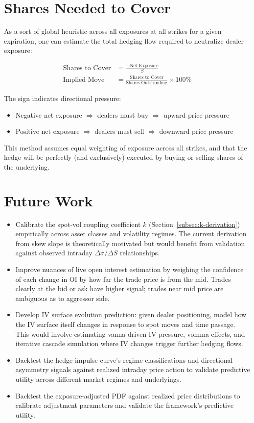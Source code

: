 \documentclass[11pt, a4paper]{article}
\begin{document}
\section{Shares Needed to Cover}

As a sort of global heuristic across all exposures at all strikes for a given expiration, one can estimate the total hedging flow required to neutralize dealer exposure:

\begin{align}
\text{Shares to Cover} &= \frac{-\text{Net Exposure}}{S} \\
\text{Implied Move} &= \frac{\text{Shares to Cover}}{\text{Shares Outstanding}} \times 100\%
\end{align}

The sign indicates directional pressure:
\begin{itemize}
    \item Negative net exposure $\Rightarrow$ dealers must buy $\Rightarrow$ upward price pressure
    \item Positive net exposure $\Rightarrow$ dealers must sell $\Rightarrow$ downward price pressure
\end{itemize}

This method assumes equal weighting of exposure across all strikes, and that the hedge will be perfectly (and exclusively) executed by buying or selling shares of the underlying.

\section{Future Work}

\begin{itemize}
    \item Calibrate the spot-vol coupling coefficient $k$ (Section~\ref{subsec:k-derivation}) empirically across asset classes and volatility regimes. The current derivation from skew slope is theoretically motivated but would benefit from validation against observed intraday $\Delta\sigma / \Delta S$ relationships.
    \item Improve nuances of live open interest estimation by weighing the confidence of each change in OI by how far the trade price is from the mid. Trades clearly at the bid or ask have higher signal; trades near mid price are ambiguous as to aggressor side.
    \item Develop IV surface evolution prediction: given dealer positioning, model how the IV surface itself changes in response to spot moves and time passage. This would involve estimating vanna-driven IV pressure, vomma effects, and iterative cascade simulation where IV changes trigger further hedging flows.
    \item Backtest the hedge impulse curve's regime classifications and directional asymmetry signals against realized intraday price action to validate predictive utility across different market regimes and underlyings.
    \item Backtest the exposure-adjusted PDF against realized price distributions to calibrate adjustment parameters and validate the framework's predictive utility.
\end{itemize}
\end{document}
